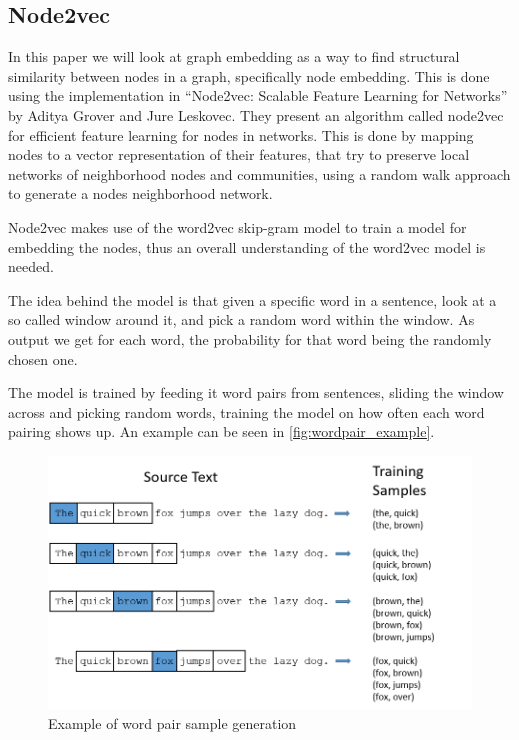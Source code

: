 \subsection{Node2vec}
In this paper we will look at graph embedding as a way to find structural similarity between nodes in a graph, specifically node embedding. This is done using the implementation in “Node2vec: Scalable Feature Learning for Networks” by Aditya Grover and Jure Leskovec. They present an algorithm called node2vec for efficient feature learning for nodes in networks. This is done by mapping nodes to a vector representation of their features, that try to preserve local networks of neighborhood nodes and communities, using a random walk approach to generate a nodes neighborhood network.

Node2vec makes use of the word2vec skip-gram model to train a model for embedding the nodes, thus an overall understanding of the word2vec model is needed.

The idea behind the model is that given a specific word in a sentence, look at a so called window around it, and pick a random word within the window. As output we get for each word, the probability for that word being the randomly chosen one.

The model is trained by feeding it word pairs from sentences, sliding the window across and picking random words, training the model on how often each word pairing shows up. An example can be seen in \autoref{fig:wordpair_example}.

\begin{figure}[H]
\centering
  \includegraphics[scale=0.6]{Article/figures/training_data.png}
  \caption{Example of word pair sample generation}
  \label{fig:wordpair_example}
\end{figure}

